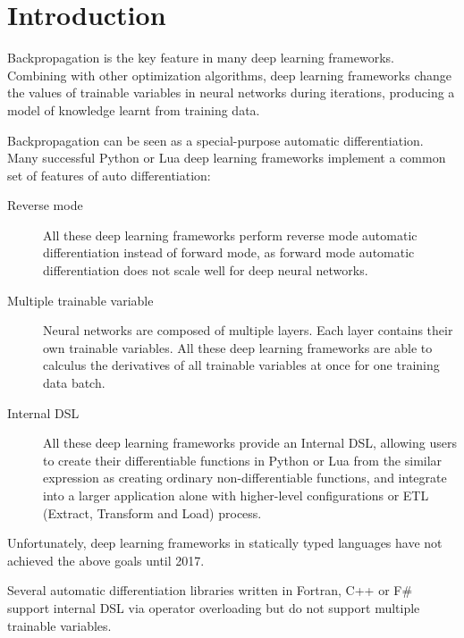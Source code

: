 \section{Introduction}

Backpropagation\cite{rumelhart1985learning} is the key feature in many deep learning frameworks. Combining with other optimization algorithms\cite{kingma2014adam, zeiler2012adadelta}, deep learning frameworks change the values of trainable variables in neural networks during iterations, producing a model of knowledge learnt from training data.

Backpropagation can be seen as a special-purpose automatic differentiation\cite{baydin2015automatic}. Many successful Python or Lua deep learning frameworks\cite{collobert2008torch,bergstra2010theano,tokui2015chainer,google2017eager,paszke2017pytorch} implement a common set of features of auto differentiation:

\begin{description}

  \item[Reverse mode] All these deep learning frameworks perform reverse mode automatic differentiation instead of forward mode, as forward mode automatic differentiation does not scale well for deep neural networks.

  \item[Multiple trainable variable] Neural networks are composed of multiple layers. Each layer contains their own trainable variables. All these deep learning frameworks are able to calculus the derivatives of all trainable variables at once for one training data batch.

  \item[Internal DSL\cite{fowler2010domain}] All these deep learning frameworks provide an Internal DSL, allowing users to create their differentiable functions in Python or Lua from the similar expression as creating ordinary non-differentiable functions, and integrate into a larger application alone with higher-level configurations\cite{chollet2015keras} or ETL (Extract, Transform and Load) process.

\end{description}

Unfortunately, deep learning frameworks in statically typed languages have not achieved the above goals until 2017.

Several automatic differentiation libraries\cite{bischof1992adifor,griewank1996algorithm,TapenadeRef13,baydin2015diffsharp} written in Fortran, C++ or F\# support internal DSL via operator overloading but do not support multiple trainable variables.

